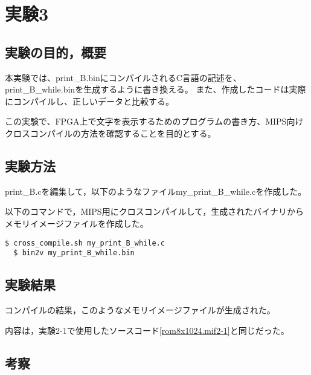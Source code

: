 \section{実験3}
\subsection{実験の目的，概要}
本実験では、print_B.binにコンパイルされるC言語の記述を、print_B_while.binを生成するように書き換える。
また、作成したコードは実際にコンパイルし、正しいデータと比較する。

この実験で、FPGA上で文字を表示するためのプログラムの書き方、MIPS向けクロスコンパイルの方法を確認することを目的とする。

\subsection{実験方法}
print\_B.cを編集して，以下のようなファイルmy\_print\_B\_while.cを作成した。


以下のコマンドで，MIPS用にクロスコンパイルして，生成されたバイナリからメモリイメージファイルを作成した。

\begin{lstlisting}[caption={クロスコンパイル},label={クロスコンパイル}]
  $ cross_compile.sh my_print_B_while.c
  $ bin2v my_print_B_while.bin
\end{lstlisting}

\subsection{実験結果}
コンパイルの結果，このようなメモリイメージファイルが生成された。


内容は，実験2-1で使用したソースコード\ref{rom8x1024.mif2-1}と同じだった。

\subsection{考察}
